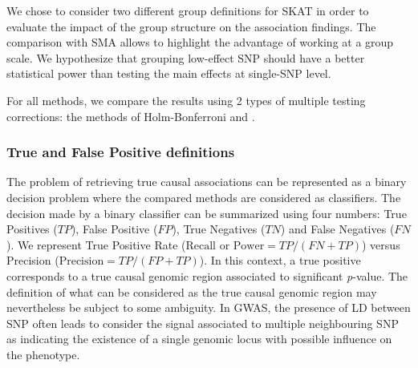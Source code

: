 \documentclass[]{book}
\begin{document}
We chose to consider two different group definitions for SKAT in order
to evaluate the impact of the group structure on the association
findings. The comparison with SMA allows to highlight the advantage of
working at a group scale. We hypothesize that grouping low-effect SNP
should have a better statistical power than testing the main effects at
single-SNP level.

For all methods, we compare the results using 2 types of multiple
testing corrections: the methods of Holm-Bonferroni \citep{Holm_Bonferroni}
and \citep{benjamini_controlling_1995}.

\hypertarget{true-and-false-positive-definitions}{%
\subsubsection{True and False Positive definitions}\label{true-and-false-positive-definitions}}

The problem of retrieving true causal associations can be represented as
a binary decision problem where the compared methods are considered as
classifiers. The decision made by a binary classifier can be summarized
using four numbers: True Positives (\(TP\)), False Positive (\(FP\)), True
Negatives (\(TN\)) and False Negatives (\(FN\)). We represent True Positive
Rate (\(\text{Recall or Power} ={TP/(FN+TP)}\)) versus Precision
(\(\text{Precision}={TP/(FP+TP)}\)). In this context, a true positive
corresponds to a true causal genomic region associated to significant
\emph{p}-value. The definition of what can be considered as the true causal
genomic region may nevertheless be subject to some ambiguity. In GWAS,
the presence of LD between SNP often leads to consider the signal
associated to multiple neighbouring SNP as indicating the existence of a
single genomic locus with possible influence on the phenotype.
\end{document}
